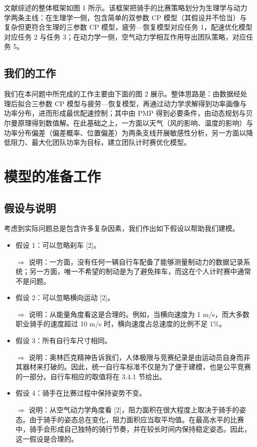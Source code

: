 \documentclass[11pt,a4paper]{ctexart}
\begin{document}
文献综述的整体框架如图 1 所示。该框架把骑手的比赛策略划分为生理学与动力学两条主线：在生理学一侧，包含简单的双参数 CP 模型（其假设并不恰当）与复杂但更符合生理的三参数 CP 模型，疲劳—恢复模型对应任务 1，配速优化模型对应任务 2 与任务 3；在动力学一侧，空气动力学相互作用导出团队策略，对应任务 5。

\subsection{我们的工作}

我们在本问题中所完成的工作主要由下面的图 2 展示。整体思路是：由数据经处理后拟合三参数 CP 模型与疲劳—恢复模型，再通过动力学求解得到功率画像与功率分布，进而形成最优配速控制；其中由 PMP 得到必要条件，由动态规划与贝尔曼原理得到数值解。在此基础之上，一方面以天气（风的影响、温度的影响）与功率分布偏差（偏差概率、位置偏差）为两条支线开展敏感性分析，另一方面以降低阻力、最大化团队功率为目标，建立团队计时赛优化模型。

\section{模型的准备工作}

\subsection{假设与说明}

考虑到实际问题总是包含许多复杂因素，我们作出如下假设以帮助我们建模。

\begin{itemize}
\item 假设 1：可以忽略刹车 [2]。

$\Rightarrow$ 说明：一方面，没有任何一辆自行车配备了能够测量制动力的数据记录系统；另一方面，唯一不希望的制动是为了避免摔车，而这在个人计时赛中通常不是问题。

\item 假设 2：可以忽略横向运动 [2]。

$\Rightarrow$ 说明：从能量角度看这是合理的。例如，当横向速度为 1 m/s，而大多数职业骑手的速度超过 10 m/s 时，横向速度占总速度的比例不足 1\%。

\item 假设 3：所有自行车尺寸相同。

$\Rightarrow$ 说明：奥林匹克精神告诉我们，人体极限与竞赛纪录是由运动员自身而非其器材来打破的。因此，统一自行车标准不仅是为了便于建模，也是公平竞赛的一部分。自行车相应的取值将在 3.4.1 节给出。

\item 假设 4：骑手在比赛过程中保持姿势不变。

$\Rightarrow$ 说明：从空气动力学角度看 [2]，阻力面积在很大程度上取决于骑手的姿态。由于骑手的姿态总在变化，阻力面积应当取平均值。在最高水平的比赛中，骑手会形成自己独特的骑行节奏，并在较长时间内保持稳定姿态。因此，这一假设是合理的。
\end{itemize}
\end{document}
